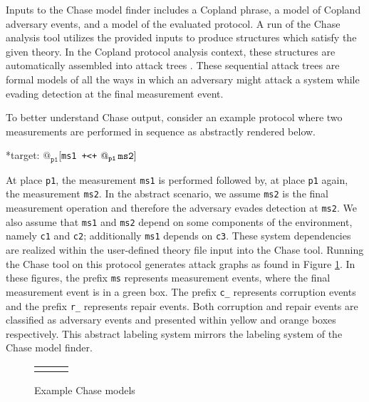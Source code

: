 \documentclass[runningheads]{llncs}
\theoremstyle{definition}
\begin{document}
Inputs to the Chase model finder includes a Copland phrase, a model of Copland adversary events, and a model of the evaluated protocol. A run of the Chase analysis tool utilizes the provided inputs to produce structures which satisfy the given theory. In the Copland protocol analysis context, these structures are automatically assembled into attack trees \cite{Rowe:2021:AutomatedTrust}. These sequential attack trees \cite{Horne:Attack, Jhaware:attack} are formal models of all the ways in which an adversary might attack a system while evading detection at the final measurement event. 

To better understand Chase output, consider an example protocol where two measurements are performed in sequence as abstractly rendered below.

\begin{center}
    *target: $@_{\texttt{p1}}$[\texttt{ms1 +<+} $\mathop{@_{\texttt{p1}}}{\texttt{ms2}}]$
\end{center}

\noindent At place \texttt{p1}, the measurement \texttt{ms1} is performed followed by, at place \texttt{p1} again, the measurement \texttt{ms2}. In the abstract scenario, we assume \texttt{ms2} is the final measurement operation and therefore the adversary evades detection at \texttt{ms2}. We also assume that \texttt{ms1} and \texttt{ms2} depend on some components of the environment, namely \texttt{c1} and \texttt{c2}; additionally \texttt{ms1} depends on \texttt{c3}. These system dependencies are realized within the user-defined theory file input into the Chase tool. Running the Chase tool on this protocol generates attack graphs as found in Figure \ref{fig:chase-ex}. In these figures, the prefix \texttt{ms} represents measurement events, where the final measurement event is in a green box. The prefix \texttt{c\_} represents corruption events and the prefix \texttt{r\_} represents repair events. Both corruption and repair events are classified as adversary events and presented within yellow and orange boxes respectively. This abstract labeling system mirrors the labeling system of the Chase model finder. 

\begin{figure}[hbtp]
    \centering 
    \begin{tabular}{c c c}
         &  &  
    \end{tabular}
    \caption[Example Chase Models]{Example Chase models}
    \label{fig:chase-ex}
\end{figure}
\end{document}
